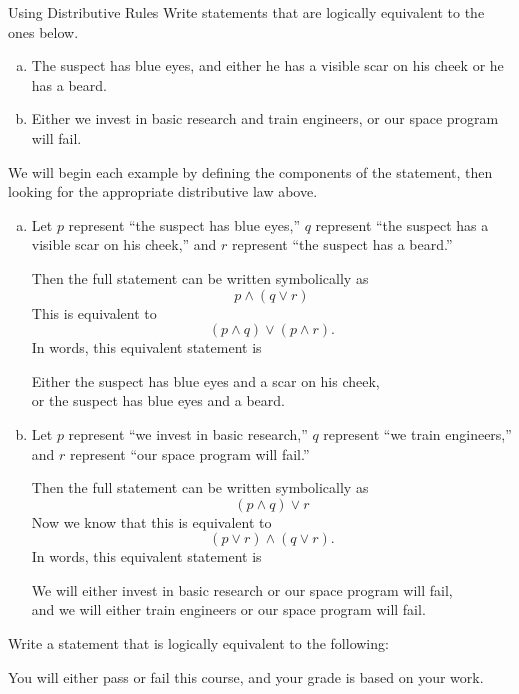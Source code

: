 \begin{example}[https://www.youtube.com/watch?v=-OWBz6l9ZzQ]{Using Distributive Rules}
Write statements that are logically equivalent to the ones below.
\begin{enumerate}[(a)]
\item The suspect has blue eyes, and either he has a visible scar on his cheek or he has a beard.
\item Either we invest in basic research and train engineers, or our space program will fail.
\end{enumerate}

\sol
We will begin each example by defining the components of the statement, then looking for the appropriate distributive law above.
\begin{enumerate}[(a)]
\item Let $p$ represent ``the suspect has blue eyes,'' $q$ represent ``the suspect has a visible scar on his cheek,'' and $r$ represent ``the suspect has a beard.''

Then the full statement can be written symbolically as
\[p \wedge (q \vee r)\]
This is equivalent to \[(p \wedge q) \vee (p \wedge r).\]
In words, this equivalent statement is 
\begin{center}
Either the suspect has blue eyes and a scar on his cheek,\\ or the suspect has blue eyes and a beard.
\end{center}
\item Let $p$ represent ``we invest in basic research,'' $q$ represent ``we train engineers,'' and $r$ represent ``our space program will fail.''

Then the full statement can be written symbolically as
\[(p \wedge q) \vee r\]
Now we know that this is equivalent to \[(p \vee r) \wedge (q \vee r).\]
In words, this equivalent statement is 
\begin{center}
We will either invest in basic research or our space program will fail,\\ and we will either train engineers or our space program will fail.
\end{center}
\end{enumerate}
\end{example}

\begin{try}
Write a statement that is logically equivalent to the following:
\begin{center}
You will either pass or fail this course, and your grade is based on your work.
\end{center}
\end{try}

